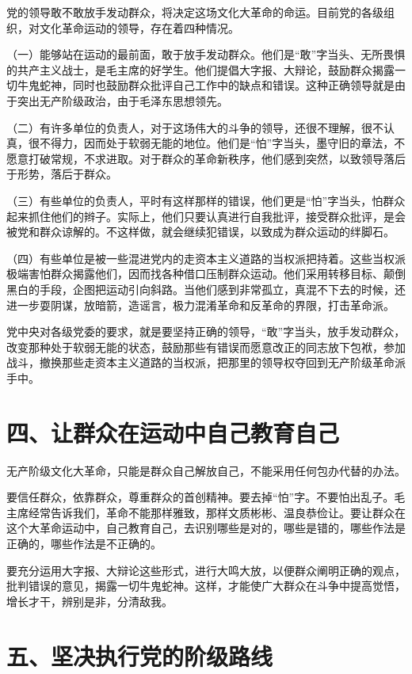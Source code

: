 党的领导敢不敢放手发动群众，将决定这场文化大革命的命运。目前党的各级组织，对文化革命运动的领导，存在着四种情况。

（一）能够站在运动的最前面，敢于放手发动群众。他们是“敢”字当头、无所畏惧的共产主义战士，是毛主席的好学生。他们提倡大字报、大辩论，鼓励群众揭露一切牛鬼蛇神，同时也鼓励群众批评自己工作中的缺点和错误。这种正确领导就是由于突出无产阶级政治，由于毛泽东思想领先。

（二）有许多单位的负责人，对于这场伟大的斗争的领导，还很不理解，很不认真，很不得力，因而处于软弱无能的地位。他们是“怕”字当头，墨守旧的章法，不愿意打破常规，不求进取。对于群众的革命新秩序，他们感到突然，以致领导落后于形势，落后于群众。

（三）有些单位的负责人，平时有这样那样的错误，他们更是“怕”字当头，怕群众起来抓住他们的辫子。实际上，他们只要认真进行自我批评，接受群众批评，是会被党和群众谅解的。不这样做，就会继续犯错误，以致成为群众运动的绊脚石。

（四）有些单位是被一些混进党内的走资本主义道路的当权派把持着。这些当权派极端害怕群众揭露他们，因而找各种借口压制群众运动。他们采用转移目标、颠倒黑白的手段，企图把运动引向斜路。当他们感到非常孤立，真混不下去的时候，还进一步耍阴谋，放暗箭，造谣言，极力混淆革命和反革命的界限，打击革命派。

党中央对各级党委的要求，就是要坚持正确的领导，“敢”字当头，放手发动群众，改变那种处于软弱无能的状态，鼓励那些有错误而愿意改正的同志放下包袱，参加战斗，撤换那些走资本主义道路的当权派，把那里的领导权夺回到无产阶级革命派手中。

\section{四、让群众在运动中自己教育自己}

无产阶级文化大革命，只能是群众自己解放自己，不能采用任何包办代替的办法。

要信任群众，依靠群众，尊重群众的首创精神。要去掉“怕”字。不要怕出乱子。毛主席经常告诉我们，革命不能那样雅致，那样文质彬彬、温良恭俭让。要让群众在这个大革命运动中，自己教育自己，去识别哪些是对的，哪些是错的，哪些作法是正确的，哪些作法是不正确的。

要充分运用大字报、大辩论这些形式，进行大鸣大放，以便群众阐明正确的观点，批判错误的意见，揭露一切牛鬼蛇神。这样，才能使广大群众在斗争中提高觉悟，增长才干，辨别是非，分清敌我。

\section{五、坚决执行党的阶级路线}

